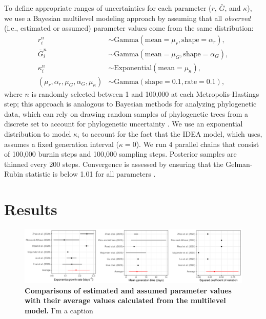 \documentclass[12pt]{article}
\begin{document}
To define appropriate ranges of uncertainties for each parameter ($r$, $\bar G$, and $\kappa$),
we use a Bayesian multilevel modeling approach by assuming that all \emph{observed} (i.e., estimated or assumed) parameter values come from the same distribution:
\begin{equation}
\begin{aligned}
r_i^n &\sim \mathrm{Gamma}(\mathrm{mean}=\mu_r, \mathrm{shape}=\alpha_r),\\
\bar{G}_i^n &\sim \mathrm{Gamma}(\mathrm{mean}=\mu_G, \mathrm{shape}=\alpha_G),\\
\kappa_i^n &\sim \mathrm{Exponential}(\mathrm{mean}=\mu_\kappa),\\
(\mu_r, \alpha_r, \mu_G, \alpha_G, \mu_\kappa) &\sim \mathrm{Gamma}(\mathrm{shape}=0.1, \mathrm{rate}=0.1),
\end{aligned}
\end{equation}
where $n$ is randomly selected between 1 and 100,000 at each Metropolis-Hastings step;
this approach is analogous to Bayesian methods for analyzing phylogenetic data, which can rely on drawing random samples of phylogenetic trees from a discrete set to account for phylogenetic uncertainty \citep{pagel2004bayesian,bedford2014integrating}.
We use an exponential distribution to model $\kappa_i$ to account for the fact that the IDEA model, which \cite{majumderncov} uses, assumes a fixed generation interval ($\kappa = 0$).
We run 4 parallel chains that consist of 100,000 burnin steps and 100,000 sampling steps.
Posterior samples are thinned every 200 steps.
Convergence is assessed by ensuring that the Gelman-Rubin statistic is below 1.01 for all parameters \citep{gelman1992inference}.

\section{Results}

\begin{figure}[!ht]
\includegraphics[width=\textwidth]{compare_assumption.pdf}
\caption{
\textbf{Comparisons of estimated and assumed parameter values with their average values calculated from the multilevel model.}
I'm a caption
}
\label{fig:assumption}
\end{figure}
\end{document}
